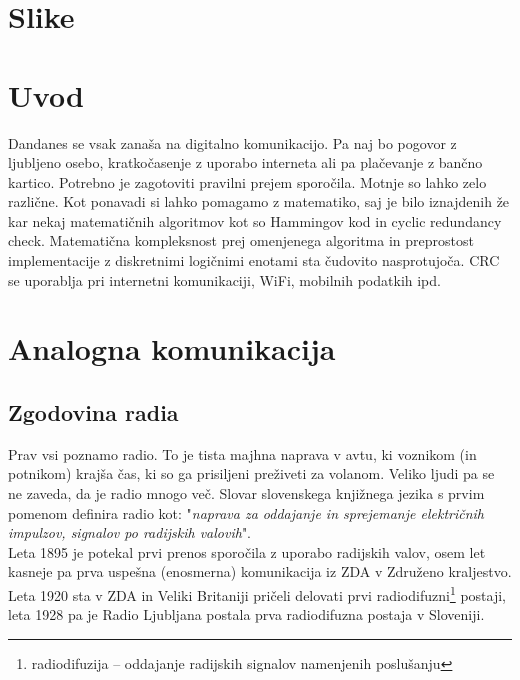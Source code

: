 \documentclass[12pt]{article}
\begin{document}
\begingroup
\makeatletter
\section*{Slike}
\let\clearpage\relax
\makeatother
\endgroup


\newpage
\section{Uvod}
Dandanes se vsak zanaša na digitalno komunikacijo. Pa naj bo pogovor z ljubljeno
osebo, kratkočasenje z uporabo interneta ali pa plačevanje z bančno kartico. 
Potrebno je zagotoviti pravilni prejem sporočila. Motnje so lahko zelo različne.
Kot ponavadi si lahko pomagamo z matematiko, saj je bilo iznajdenih že kar nekaj
matematičnih algoritmov kot so Hammingov kod in cyclic redundancy check. 
Matematična kompleksnost prej omenjenega algoritma in preprostost
implementacije z diskretnimi logičnimi enotami sta čudovito nasprotujoča. CRC se
uporablja pri internetni komunikaciji, WiFi, mobilnih podatkih ipd.
\section{Analogna komunikacija}
    \subsection{Zgodovina radia}
        Prav vsi poznamo radio. To je tista majhna naprava v avtu, ki 
        voznikom (in potnikom) krajša čas, ki so ga prisiljeni preživeti za
        volanom. Veliko ljudi pa se ne zaveda, da je radio mnogo več. Slovar
        slovenskega knjižnega jezika s prvim pomenom definira radio
        kot: "\textit{naprava za oddajanje in sprejemanje električnih 
        impulzov, signalov po radijskih valovih}". \cite{SSKJ-radio}\\
        Leta 1895 \cite{ppt} je potekal prvi prenos sporočila z uporabo
        radijskih valov, osem let kasneje pa prva uspešna (enosmerna) 
        komunikacija iz ZDA v Združeno kraljestvo. Leta 1920 sta v ZDA in 
        Veliki Britaniji pričeli delovati prvi radiodifuzni\footnote{
        radiodifuzija – oddajanje radijskih signalov namenjenih poslušanju} 
        postaji, leta 1928 pa je Radio Ljubljana postala prva radiodifuzna 
        postaja v Sloveniji.
\end{document}
